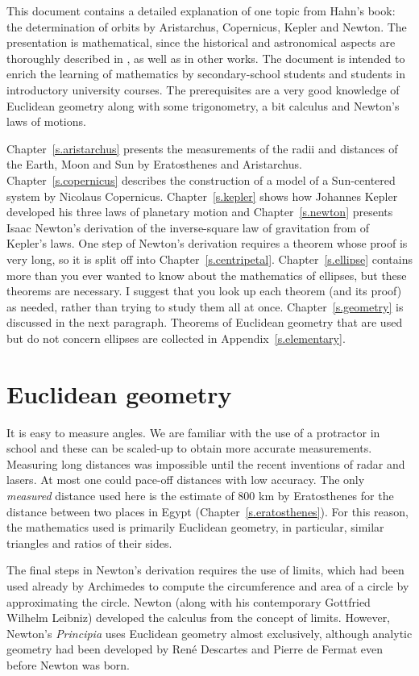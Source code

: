 This document contains a detailed explanation of one topic from Hahn's book: the determination of orbits by Aristarchus, Copernicus, Kepler and Newton. The presentation is mathematical, since the historical and astronomical aspects are thoroughly described in \cite{hahn-cic}, as well as in other works. The document is intended to enrich the learning of mathematics by secondary-school students and students in introductory university courses. The prerequisites are a very good knowledge of Euclidean geometry along with some trigonometry, a bit calculus and Newton's laws of motions.

Chapter~\ref{s.aristarchus} presents the measurements of the radii and distances of the Earth, Moon and Sun by Eratosthenes and Aristarchus. Chapter~\ref{s.copernicus} describes the construction of a model of a Sun-centered system by Nicolaus Copernicus. Chapter~\ref{s.kepler} shows how Johannes Kepler developed his three laws of planetary motion and Chapter~\ref{s.newton} presents Isaac Newton's derivation of the inverse-square law of gravitation from of Kepler's laws. One step of Newton's derivation requires a theorem whose proof is very long, so it is split off into Chapter~\ref{s.centripetal}. Chapter~\ref{s.ellipse} contains more than you ever wanted to know about the mathematics of ellipses, but these theorems are necessary. I suggest that you look up each theorem (and its proof) as needed, rather than trying to study them all at once. Chapter~\ref{s.geometry} is discussed in the next paragraph. Theorems of Euclidean geometry that are used but do not concern ellipses are collected in Appendix~\ref{s.elementary}.

\section*{Euclidean geometry}

It is easy to measure angles. We are familiar with the use of a protractor in school and these can be scaled-up to obtain more accurate measurements. Measuring long distances was impossible until the recent inventions of radar and lasers. At most one could pace-off distances with low accuracy. The only \emph{measured} distance used here is the estimate of $800$ km by Eratosthenes for the distance between two places in Egypt (Chapter~\ref{s.eratosthenes}). For this reason, the mathematics used is primarily Euclidean geometry, in particular, similar triangles and ratios of their sides.

The final steps in Newton's derivation requires the use of limits, which had been used already by Archimedes to compute the circumference and area of a circle by approximating the circle. Newton (along with his contemporary Gottfried Wilhelm Leibniz) developed the calculus from the concept of limits. However, Newton's \textit{Principia} uses Euclidean geometry almost exclusively, although analytic geometry had been developed by René Descartes and Pierre de Fermat even before Newton was born.

